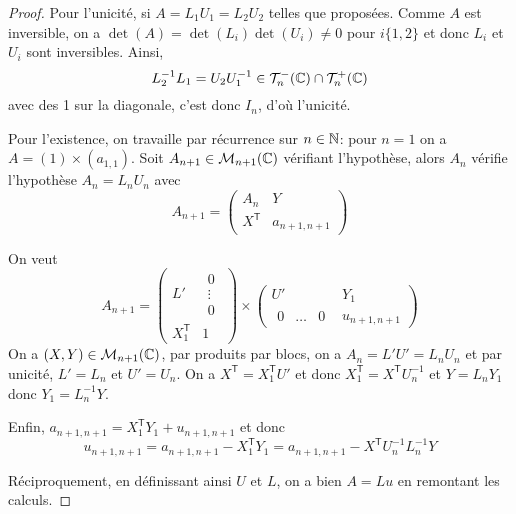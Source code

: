 \documentclass[12pt]{article}
\begin{document}
\begin{proof}
    Pour l'unicité, si $A=L_{1}U_{1}=L_{2}U_{2}$ telles que proposées. Comme $A$ est inversible, on a $\det(A)=\det(L_{i})\det(U_{i})\neq0$ pour $i\lbrace1,2\rbrace$ et donc $L_{i}$ et $U_{i}$ sont inversibles. Ainsi,
    \begin{equation}
        L_{2}^{-1}L_{1}=U_{2}U_{1}^{-1}\in \mathcal{T}_{n}^{-}(\mathbb{C})\cap\mathcal{T}_{n}^{+}(\mathbb{C})
    \end{equation}
    avec des 1 sur la diagonale, c'est donc $I_{n}$, d'où l'unicité.

    Pour l'existence, on travaille par récurrence sur $n\in\mathbb{N}$: pour $n=1$ on a $A=(1)\times(a_{1,1})$. Soit $A_{n+1}\in \mathcal{M}_{n+1}(\mathbb{C})$ vérifiant l'hypothèse, alors $A_{n}$ vérifie l'hypothèse $A_{n}=L_{n}U_{n}$ avec 
    \begin{equation}
        A_{n+1}=
        \begin{pmatrix}
            A_{n} & Y\\
            X^{\mathsf{T}} & a_{n+1,n+1}
        \end{pmatrix}
    \end{equation}

    On veut 
    \begin{equation}
        A_{n+1}=
        \begin{pmatrix}
            L' &\begin{matrix}
                0\\\vdots\\0
            \end{matrix}\\
            X_{1}^{\mathsf{T}} &1
        \end{pmatrix}\times\begin{pmatrix}
            U' & Y_{1}\\
            \begin{matrix}
                0&\dots&0
            \end{matrix}&u_{n+1,n+1}
        \end{pmatrix}
    \end{equation}
    On a $(X,Y)\in\mathcal{M}_{n+1}(\mathbb{C})$, par produits par blocs, on a $A_{n}=L'U'=L_{n}U_{n}$ et par unicité, $L'=L_{n}$ et $U'=U_{n}$. On a $X^{\mathsf{T}}=X_{1}^{\mathsf{T}}U'$ et donc $X_{1}^{\mathsf{T}}=X^{\mathsf{T}}U_{n}^{-1}$ et $Y=L_{n}Y_{1}$ donc $Y_{1}=L_{n}^{-1}Y$.

    Enfin, $a_{n+1,n+1}=X_{1}^{\mathsf{T}}Y_{1}+u_{n+1,n+1}$ et donc 
    \begin{equation}
        u_{n+1,n+1}=a_{n+1,n+1}-X_{1}^{\mathsf{T}}Y_{1}=a_{n+1,n+1}-X^{\mathsf{T}}U_{n}^{-1}L_{n}^{-1}Y
    \end{equation}

    Réciproquement, en définissant ainsi $U$ et $L$, on a bien $A=Lu$ en remontant les calculs.
\end{proof}
\end{document}
